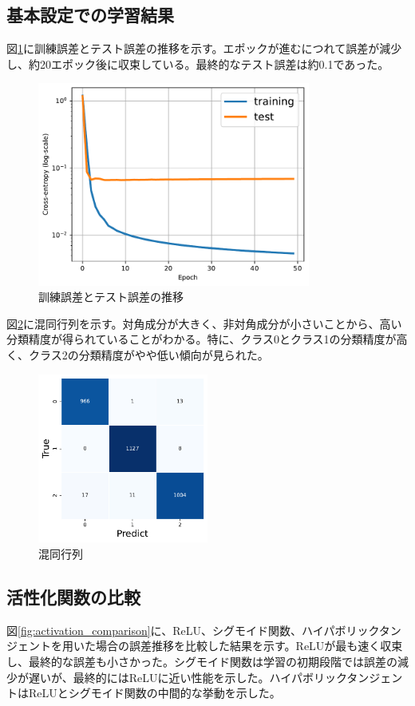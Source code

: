 \documentclass{article}
\begin{document}
\subsection{基本設定での学習結果}
図\ref{fig:error}に訓練誤差とテスト誤差の推移を示す。エポックが進むにつれて誤差が減少し、約20エポック後に収束している。最終的なテスト誤差は約0.1であった。

\begin{figure}[htbp]
  \centering
  \includegraphics[width=0.8\textwidth]{error.pdf}
  \caption{訓練誤差とテスト誤差の推移}
  \label{fig:error}
\end{figure}

図\ref{fig:confusion}に混同行列を示す。対角成分が大きく、非対角成分が小さいことから、高い分類精度が得られていることがわかる。特に、クラス0とクラス1の分類精度が高く、クラス2の分類精度がやや低い傾向が見られた。

\begin{figure}[htbp]
  \centering
  \includegraphics[width=0.5\textwidth]{confusion.pdf}
  \caption{混同行列}
  \label{fig:confusion}
\end{figure}

\subsection{活性化関数の比較}
図\ref{fig:activation_comparison}に、ReLU、シグモイド関数、ハイパボリックタンジェントを用いた場合の誤差推移を比較した結果を示す。ReLUが最も速く収束し、最終的な誤差も小さかった。シグモイド関数は学習の初期段階では誤差の減少が遅いが、最終的にはReLUに近い性能を示した。ハイパボリックタンジェントはReLUとシグモイド関数の中間的な挙動を示した。
\end{document}
